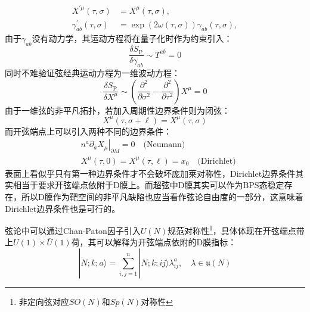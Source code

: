 \begin{equation}
	\begin{aligned}
		X^{\prime\mu}(\tau,\sigma)&=X^\mu(\tau,\sigma),\\\gamma_{ab}^{\prime}(\tau,\sigma)&=\exp(2\omega(\tau,\sigma))\gamma_{ab}(\tau,\sigma),
	\end{aligned}
\end{equation}
由于$\gamma_{ab}$没有动力学，其运动方程将在量子化时作为约束引入：
\begin{equation}
	\label{eq:2.6}
	\frac{\delta S_\mathrm{P}}{\delta \gamma_{ab}}\sim T^{ab}=0
\end{equation}
同时不难验证弦经典运动方程为一维波动方程：
\begin{equation}
		\frac{\delta S_\mathrm{P}}{\delta X^\mu}\sim\left(\frac{\partial^2}{\partial\sigma^2}-\frac{\partial^2}{\partial\tau^2}\right)X^\mu=0
\end{equation}
由于一维弦的非平凡拓扑，若加入周期性边界条件则为闭弦：
\begin{equation}
	\label{eq:2.8}
	X^\mu(\tau,\sigma+\ell) = X^\mu(\tau,\sigma)
\end{equation}
而开弦端点上可以引入两种不同的边界条件：
\begin{equation}
	\label{eq:2.9}
	\begin{aligned}
	&	\left.n^a\partial_aX_\mu\right|_{\partial M}=0\quad \text{(Neumann)}\\
	&	X^\mu(\tau,0)=X^\mu(\tau,\ell)=x_0\quad \text{(Dirichlet)}
	\end{aligned}
\end{equation}
表面上看似乎只有第一种边界条件才不会破坏庞加莱对称性，Dirichlet边界条件其实相当于要求开弦端点依附于D膜上。而超弦中D膜其实可以作为BPS态稳定存在，所以D膜作为靶空间的非平凡缺陷也应当看作弦论自由度的一部分，这意味着Dirichlet边界条件也是可行的。

弦论中可以通过Chan-Paton因子引入$U(N)$规范对称性\footnote{非定向弦对应$SO(N)$和$Sp(N)$对称性}，具体体现在开弦端点带上$U(1)\times \bar U(1)$荷，其可以解释为开弦端点依附的D膜指标：
\begin{equation}
	|N;k;a\rangle=\sum_{i,j=1}^n|N;k;ij\rangle\lambda_{ij}^a,\quad \lambda\in \mathfrak{u}(N)
\end{equation}
